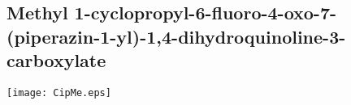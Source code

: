 \newpage

\subsection{Methyl 1\hyp{}cyclopropyl\hyp{}6\hyp{}fluoro\hyp{}4\hyp{}oxo\hyp{}7\hyp{}(piperazin\hyp{}1\hyp{}yl)\hyp{}1,4\hyp{}dihydroquinoline\hyp{}3\hyp{}carboxylate }


\begin{scheme}[H]
	\begin{center}
		\texttt{[image: CipMe.eps]}
	\end{center}
\end{scheme}

